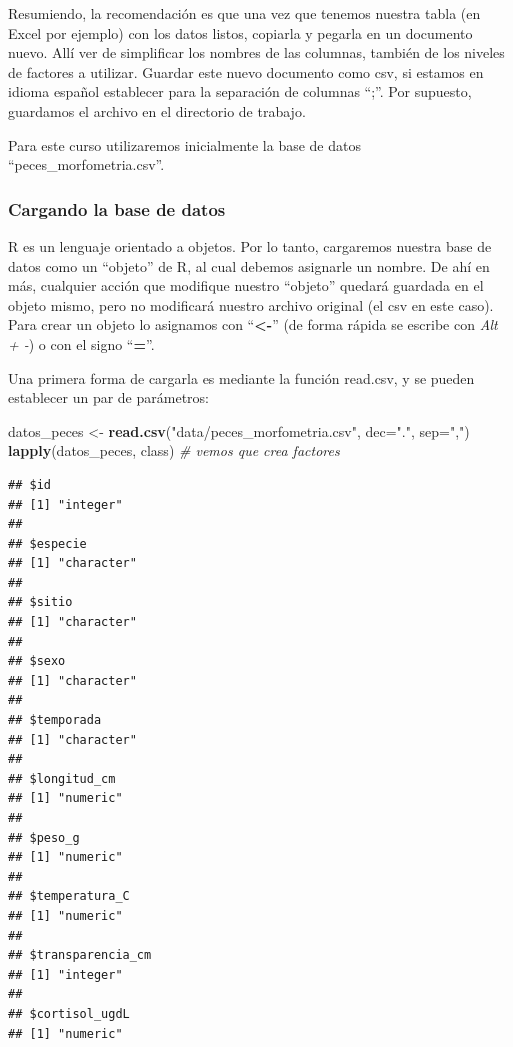 \documentclass[
]{article}
\newenvironment{Shaded}{\begin{snugshade}}{\end{snugshade}}
\newcommand{\AttributeTok}[1]{\textcolor[rgb]{0.13,0.29,0.53}{#1}}
\newcommand{\CommentTok}[1]{\textcolor[rgb]{0.56,0.35,0.01}{\textit{#1}}}
\newcommand{\FunctionTok}[1]{\textcolor[rgb]{0.13,0.29,0.53}{\textbf{#1}}}
\newcommand{\NormalTok}[1]{#1}
\newcommand{\OtherTok}[1]{\textcolor[rgb]{0.56,0.35,0.01}{#1}}
\newcommand{\StringTok}[1]{\textcolor[rgb]{0.31,0.60,0.02}{#1}}
\begin{document}
Resumiendo, la recomendación es que una vez que tenemos nuestra tabla
(en Excel por ejemplo) con los datos listos, copiarla y pegarla en un
documento nuevo. Allí ver de simplificar los nombres de las columnas,
también de los niveles de factores a utilizar. Guardar este nuevo
documento como csv, si estamos en idioma español establecer para la
separación de columnas ``;''. Por supuesto, guardamos el archivo en el
directorio de trabajo.

Para este curso utilizaremos inicialmente la base de datos
``peces\_morfometria.csv''.

\subsubsection{Cargando la base de
datos}\label{cargando-la-base-de-datos}

R es un lenguaje orientado a objetos. Por lo tanto, cargaremos nuestra
base de datos como un ``objeto'' de R, al cual debemos asignarle un
nombre. De ahí en más, cualquier acción que modifique nuestro ``objeto''
quedará guardada en el objeto mismo, pero no modificará nuestro archivo
original (el csv en este caso). Para crear un objeto lo asignamos con
``\textbf{\textless-}'' (de forma rápida se escribe con \emph{Alt + -})
o con el signo ``\textbf{=}''.

Una primera forma de cargarla es mediante la función read.csv, y se
pueden establecer un par de parámetros:

\begin{Shaded}
\begin{Highlighting}[]
\NormalTok{datos\_peces }\OtherTok{\textless{}{-}} \FunctionTok{read.csv}\NormalTok{(}\StringTok{"data/peces\_morfometria.csv"}\NormalTok{, }\AttributeTok{dec=}\StringTok{"."}\NormalTok{, }\AttributeTok{sep=}\StringTok{","}\NormalTok{)}
\FunctionTok{lapply}\NormalTok{(datos\_peces, class) }\CommentTok{\# vemos que crea factores}
\end{Highlighting}
\end{Shaded}

\begin{verbatim}
## $id
## [1] "integer"
## 
## $especie
## [1] "character"
## 
## $sitio
## [1] "character"
## 
## $sexo
## [1] "character"
## 
## $temporada
## [1] "character"
## 
## $longitud_cm
## [1] "numeric"
## 
## $peso_g
## [1] "numeric"
## 
## $temperatura_C
## [1] "numeric"
## 
## $transparencia_cm
## [1] "integer"
## 
## $cortisol_ugdL
## [1] "numeric"
\end{verbatim}
\end{document}
